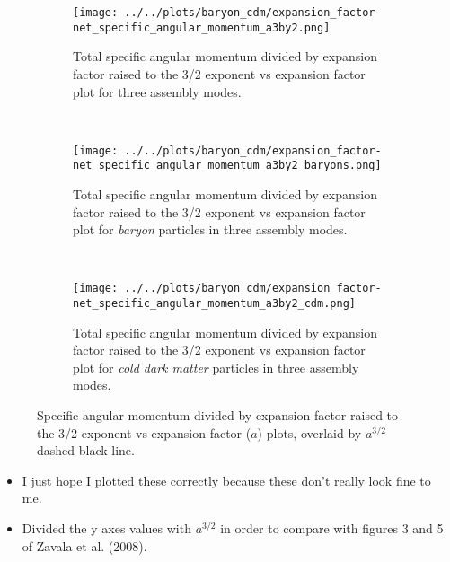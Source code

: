 \documentclass{article}
\begin{document}
	\begin{figure} [h!]
		\centering
		\begin{subfigure} {\columnwidth}
				\centering 
				\texttt{[image: ../../plots/baryon\_cdm/expansion\_factor-net\_specific\_angular\_momentum\_a3by2.png]}
				\caption{Total specific angular momentum divided by expansion factor raised to the 3/2 exponent vs expansion factor plot for three assembly modes.}
		\end{subfigure} \\
			\vspace{1cm}
		\begin{subfigure} {\columnwidth}
				\centering 
				\texttt{[image: ../../plots/baryon\_cdm/expansion\_factor-net\_specific\_angular\_momentum\_a3by2\_baryons.png]}
				\caption{Total specific angular momentum divided by expansion factor raised to the 3/2 exponent vs expansion factor plot for \emph{baryon} particles in three assembly modes.}
		\end{subfigure} \\
			\vspace{1cm}
		\begin{subfigure} {\columnwidth}
				\centering 
				\texttt{[image: ../../plots/baryon\_cdm/expansion\_factor-net\_specific\_angular\_momentum\_a3by2\_cdm.png]}
				\caption{Total specific angular momentum divided by expansion factor raised to the 3/2 exponent vs expansion factor plot for \emph{cold dark matter} particles in three assembly modes.}
		\end{subfigure}
		\caption{Specific angular momentum divided by expansion factor raised to the 3/2 exponent vs expansion factor (\(a\)) plots, overlaid by \(a^{3/2}\) dashed black line.}
	\end{figure}

	\begin{itemize}
		\item I just hope I plotted these correctly because these don't really look fine to me. 
		\item Divided the y axes values with \(a^{3/2}\) in order to compare with figures 3 and 5 of Zavala et al. (2008).
	\end{itemize}
\end{document}

